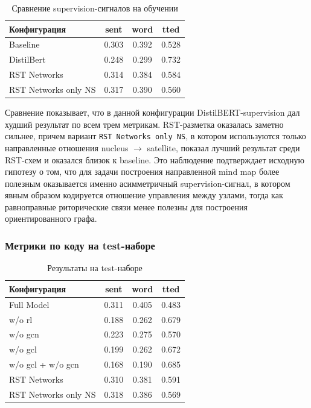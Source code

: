 \documentclass[12pt,a4paper]{article}
\begin{document}
\begin{table}[H]
\centering
\caption{Сравнение supervision-сигналов на обучении}
\begin{tabular}{lccc}
\toprule
Конфигурация & sent & word & tted \\
\midrule
Baseline & 0.303 & 0.392 & 0.528 \\
DistilBert & 0.248 & 0.299 & 0.732 \\
RST Networks & 0.314 & 0.384 & 0.584 \\
RST Networks only NS & 0.317 & 0.390 & 0.560 \\
\bottomrule
\end{tabular}
\end{table}

Сравнение показывает, что в данной конфигурации DistilBERT-supervision дал худший
результат по всем трем метрикам. RST-разметка оказалась заметно сильнее, причем вариант
\texttt{RST Networks only NS}, в котором используются только направленные отношения
nucleus $\rightarrow$ satellite, показал лучший результат среди RST-схем и оказался
близок к baseline. Это наблюдение подтверждает исходную гипотезу о том, что для
задачи построения направленной mind map более полезным оказывается именно
асимметричный supervision-сигнал, в котором явным образом кодируется отношение
управления между узлами, тогда как равноправные риторические связи менее полезны
для построения ориентированного графа.

\subsubsection{Метрики по коду на test-наборе}

\begin{table}[H]
\centering
\caption{Результаты на test-наборе}
\begin{tabular}{lccc}
\toprule
Конфигурация & sent & word & tted \\
\midrule
Full Model & 0.311 & 0.405 & 0.483 \\
w/o rl & 0.188 & 0.262 & 0.679 \\
w/o gcn & 0.223 & 0.275 & 0.570 \\
w/o gcl & 0.199 & 0.262 & 0.672 \\
w/o gcl + w/o gcn & 0.168 & 0.190 & 0.685 \\
RST Networks & 0.310 & 0.381 & 0.591 \\
RST Networks only NS & 0.318 & 0.386 & 0.569 \\
\bottomrule
\end{tabular}
\end{table}
\end{document}
